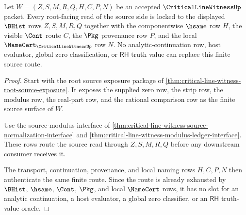 \begin{theorem}
\label{thm:critical-line-witness-root-source-lock}
Let $W=(Z,S,M,R,Q,H,C,P,N)$ be an accepted $\CriticalLineWitnessUp$ packet. Every root-facing read of the source side is locked to the displayed $\BHist$ rows $Z,S,M,R,Q$ together with the componentwise $\hsame$ row $H$, the visible $\Cont$ route $C$, the $\Pkg$ provenance row $P$, and the local $\NameCert_{\CriticalLineWitnessUp}$ row $N$. No analytic-continuation row, host evaluator, global zero classification, or $\mathsf{RH}$ truth value can replace this finite source route.
\end{theorem}
\begin{proof}
Start with the root source exposure package of \autoref{thm:critical-line-witness-root-source-exposure}. It exposes the supplied zero row, the strip row, the modulus row, the real-part row, and the rational comparison row as the finite source surface of $W$.

Use the source-modulus interface of \autoref{thm:critical-line-witness-source-normalization-interface} and \autoref{thm:critical-line-witness-modulus-ledger-interface}. These rows route the source read through $Z,S,M,R,Q$ before any downstream consumer receives it.

The transport, continuation, provenance, and local naming rows $H,C,P,N$ then authenticate the same finite route. Since the route is already exhausted by $\BHist$, $\hsame$, $\Cont$, $\Pkg$, and local $\NameCert$ rows, it has no slot for an analytic continuation, a host evaluator, a global zero classifier, or an $\mathsf{RH}$ truth-value oracle.
\end{proof}

